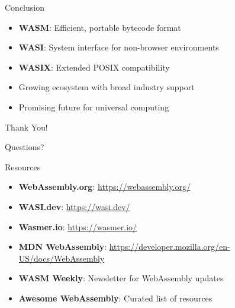 \documentclass[11pt,aspectratio=169]{beamer}
\begin{document}
\begin{frame}{Conclusion}
\begin{itemize}
    \item \textbf{WASM}: Efficient, portable bytecode format
    \item \textbf{WASI}: System interface for non-browser environments
    \item \textbf{WASIX}: Extended POSIX compatibility
    \item Growing ecosystem with broad industry support
    \item Promising future for universal computing
\end{itemize}

\vspace{0.5cm}
\begin{center}
\Large Thank You!

\vspace{0.5cm}
\normalsize
Questions?
\end{center}
\end{frame}

\begin{frame}{Resources}
\begin{itemize}
    \item \textbf{WebAssembly.org}: \url{https://webassembly.org/}
    \item \textbf{WASI.dev}: \url{https://wasi.dev/}
    \item \textbf{Wasmer.io}: \url{https://wasmer.io/}
    \item \textbf{MDN WebAssembly}: \url{https://developer.mozilla.org/en-US/docs/WebAssembly}
    \item \textbf{WASM Weekly}: Newsletter for WebAssembly updates
    \item \textbf{Awesome WebAssembly}: Curated list of resources
\end{itemize}
\end{frame}
\end{document}
